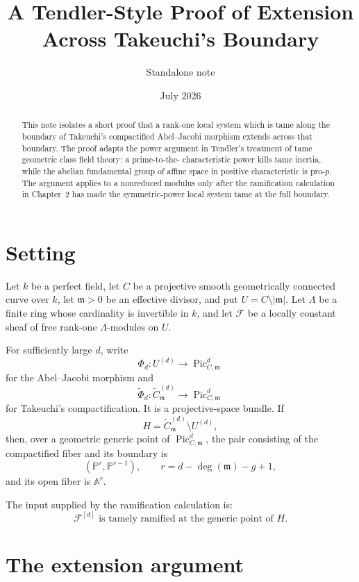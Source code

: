 \documentclass[11pt]{article}
\title{A Tendler-Style Proof of Extension\\Across Takeuchi's Boundary}
\author{Standalone note}
\date{July 2026}
\newcommand{\A}{\mathbb A}
\newcommand{\Pj}{\mathbb P}
\newcommand{\F}{\mathcal F}
\newcommand{\m}{\mathfrak m}
\newcommand{\Pic}{\operatorname{Pic}}
\begin{document}
\maketitle

\begin{abstract}
This note isolates a short proof that a rank-one local system which is tame
along the boundary of Takeuchi's compactified Abel--Jacobi morphism extends
across that boundary.  The proof adapts the power argument in
Tendler's treatment of tame geometric class field theory: a prime-to-the-
characteristic power kills tame inertia, while the abelian fundamental group
of affine space in positive characteristic is pro-$p$.  The argument applies
to a nonreduced modulus only after the ramification calculation in Chapter~2
has made the symmetric-power local system tame at the full boundary.
\end{abstract}

\section{Setting}

Let $k$ be a perfect field, let $C$ be a projective smooth geometrically
connected curve over $k$, let $\m>0$ be an effective divisor, and put
$U=C\setminus |\m|$.  Let $\Lambda$ be a finite ring whose cardinality is
invertible in $k$, and let $\F$ be a locally constant sheaf of free rank-one
$\Lambda$-modules on $U$.

For sufficiently large $d$, write
\[
 \Phi_d\colon U^{(d)}\longrightarrow \Pic_{C,\m}^{d}
\]
for the Abel--Jacobi morphism and
\[
 \widetilde\Phi_d\colon
 \widetilde C^{(d)}_{\m}\longrightarrow \Pic_{C,\m}^{d}
\]
for Takeuchi's compactification.  It is a projective-space bundle.  If
\[
 H=\widetilde C^{(d)}_{\m}\setminus U^{(d)},
\]
then, over a geometric generic point of $\Pic_{C,\m}^{d}$, the pair consisting
of the compactified fiber and its boundary is
\begin{equation}\label{eq:generic-fiber}
 \left(\Pj^r,\Pj^{r-1}\right),
 \qquad
 r=d-\deg(\m)-g+1,
\end{equation}
and its open fiber is $\A^r$.

The input supplied by the ramification calculation is:
\begin{equation}\label{eq:tame-input}
 \F^{[d]}\text{ is tamely ramified at the generic point of }H.
\end{equation}

\section{The extension argument}
\end{document}
